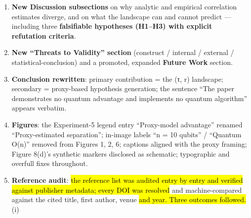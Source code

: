 \documentclass[
  11pt,
]{article}
\providecommand{\DIFadd}[1]{\hl{#1}} %
\providecommand{\DIFdel}[1]{} %
\providecommand{\DIFaddbegin}{} %
\providecommand{\DIFaddend}{} %
\providecommand{\DIFdelbegin}{} %
\providecommand{\DIFdelend}{} %
\providecommand{\DIFaddbegin}{}
\begin{document}
\begin{enumerate}
  stochastic runs): a C--δ grid for the crossover (Table 8: rho* moves
  from 0.38 to beyond the sweep; ordinal reading is the robust one) and
  an encoder/resolution sensitivity table for the real streams (Table:
  10 re-encodings; the NYC-above-Machine-Temperature ordering holds in
  all 10).
\item
  \textbf{New Discussion subsections} on why analytic and empirical
  correlation estimates diverge, and on what the landscape can and
  cannot predict --- including three \textbf{falsifiable hypotheses
  (H1--H3) with explicit refutation criteria}.
\item
  \textbf{New ``Threats to Validity'' section} (construct / internal /
  external / statistical-conclusion) and a promoted, expanded
  \textbf{Future Work} section.
\item
  \textbf{Conclusion rewritten}: primary contribution = the (τ, r)
  landscape; secondary = proxy-based hypothesis generation; the sentence
  ``The paper demonstrates no quantum advantage and implements no
  quantum algorithm'' appears verbatim.
\item
  \textbf{Figures}: the Experiment-5 legend entry ``Proxy-model
  advantage'' renamed ``Proxy-estimated separation''; in-image labels
  ``n = 10 qubits'' / ``Quantum O(n)'' removed from Figures 1, 2, 6;
  captions aligned with the proxy framing; Figure 8(d)'s synthetic
  markers disclosed as schematic; typographic and overfull fixes
  throughout.
\item
  \textbf{Reference audit\DIFdelbegin \DIFdel{(preprints and metadata)}\DIFdelend }: \DIFdelbegin \DIFdel{all 54 references
  were classified, and every entry was then verified at the metadatalevel --- all 51 DOIs were resolved
  through doi.org content
  negotiation }\DIFdelend \DIFaddbegin \DIFadd{the reference list was audited entry by
  entry and verified against publisher metadata; every DOI was resolved
  }\DIFaddend and machine-compared against the cited title, first author, venue \DIFdelbegin \DIFdel{, and
  year, with the non-DOI entries checked at source. Two corrections resulted: }\DIFdelend \DIFaddbegin \DIFadd{and
  year. Three outcomes followed. }\DIFaddend (i) \DIFdelbegin \DIFdel{Kallaugher, Parekh and Voronova (SOSA
  2025) now carries the SIAM proceedings DOI (10.1137/1.9781611978315.2)
  instead of its arXiv link, with the printed byline order confirmed on
  the publisher's pages; and (ii) a transposed article number in the Su, Guo and Wang (2024) entry was corrected (Information Sciences 676,
  article 120799, DOI 10.1016/j.ins.2024.120799 --- the previously cited
}
\end{enumerate}
\end{document}
